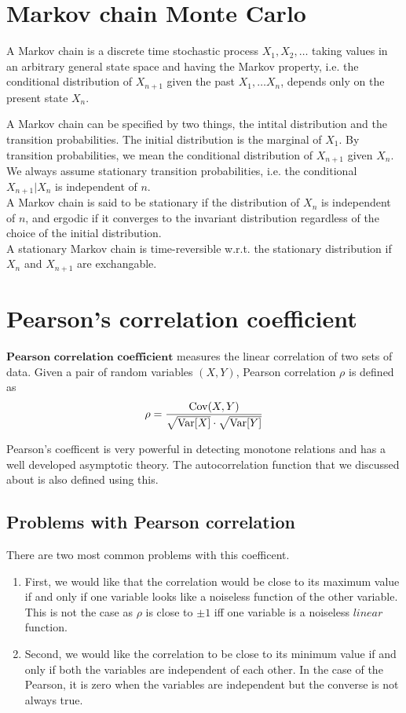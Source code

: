 \documentclass{article}
\begin{document}
\section{Markov chain Monte Carlo}
	A Markov chain is a discrete time stochastic process $X_1, X_2, \dots$ taking values in an arbitrary general state space and having the Markov property,
	i.e. the conditional distribution of $X_{n+1}$ given the past $X_1, \dots X_n$, depends only on the present state $X_n$.

	A Markov chain can be specified by two things, the intital distribution and the transition probabilities.
	The initial distribution is the marginal of $X_1$. By transition probabilities, we mean the conditional distribution of $X_{n+1}$ given $X_n$.
	We always assume stationary transition probabilities, i.e. the conditional $X_{n+1}|X_n$ is independent of $n$.\\
	A Markov chain is said to be stationary if the distribution of $X_n$ is independent of $n$,
	and ergodic if it converges to the invariant distribution regardless of the choice of the initial distribution.\\
	A stationary Markov chain is time-reversible w.r.t. the stationary distribution if $X_n$ and $X_{n+1}$ are exchangable.



\section{Pearson's correlation coefficient}
	$\textbf{Pearson correlation coefficient}$ measures the linear correlation of two sets of data.
	Given a pair of random variables $(X, Y)$, Pearson correlation $\rho$ is defined as
	$$\rho = \frac{\text{Cov}(X, Y)}{\sqrt{\text{Var}[X]} \cdot \sqrt{\text{Var}[Y]}}$$

	Pearson's coefficent is very powerful in detecting monotone relations and
	has a well developed asymptotic theory. The autocorrelation function that we discussed about is also defined using this.

	\subsection{Problems with Pearson correlation}
		There are two most common problems with this coefficent.
		\begin{enumerate}
			\item First, we would like that the correlation would be close to its maximum value
			if and only if one variable looks like a noiseless function of the other variable.
			This is not the case as $\rho$ is close to $\pm 1$ iff one variable is a noiseless $\textit{linear}$ function.
			\item Second, we would like the correlation to be close to its minimum value if and only if both the variables are independent of each other.
			In the case of the Pearson, it is zero when the variables are independent but the converse is not always true.
		\end{enumerate}
\end{document}
